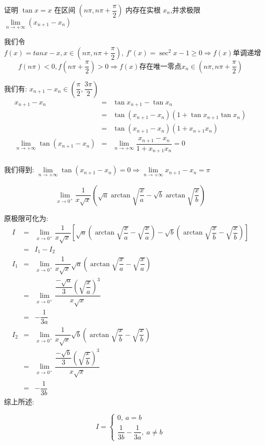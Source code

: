 \begin{example}[][Exam: 32.2.13]
	证明 $\tan x=x$ 在区间 $(n\pi,n\pi+\dfrac{\pi}{2})$ 内存在实根 $x_{n}$,并求极限 $\lim\limits_{n\to +\infty}(x_{n+1}-x_{n})$
\end{example}

\begin{solution}
	
	我们令$f(x)=tan x-x,x\in(n\pi,n\pi+\dfrac{\pi}{2}),\ f'(x)=\sec^{2} x -1\geq 0\Rightarrow f(x)\text{单调递增}$
	$$f(n\pi)<0,f(n\pi+\dfrac{\pi}{2})>0\Rightarrow f(x)\text{存在唯一零点} x_{n}\in (n\pi,n\pi+\dfrac{\pi}{2})$$
	
	我们有: $x_{n+1}-x_{n}\in(\dfrac{\pi}{2},\dfrac{3\pi}{2})$
	\begin{eqnarray*}
		x_{n+1}-x_{n}&=&\tan x_{n+1}-\tan x_{n}\\
		&=&\tan(x_{n+1}-x_{n})(1+\tan x_{n+1}\tan x_{n})\\
		&=&\tan(x_{n+1}-x_{n})(1+x_{n+1}x_{n})\\
		\lim\limits_{n\to +\infty}\tan(x_{n+1}-x_{n})&=&\lim\limits_{n\to +\infty}\dfrac{x_{n+1}-x_{n}}{1+x_{n+1}x_{n}}=0\\
	\end{eqnarray*}
	
	我们得到: $\lim\limits_{n\to +\infty}\tan(x_{n+1}-x_{n})=0\Rightarrow \lim\limits_{n\to +\infty}x_{n+1}-x_{n}=\pi$
\end{solution}

\begin{example}[][Exam: 32.2.14]
	$$\lim\limits_{x\to 0^{+}}\dfrac{1}{x\sqrt{x}}(\sqrt{a}\arctan\sqrt{\dfrac{x}{a}}-\sqrt{b}\arctan\sqrt{\dfrac{x}{b}})$$
\end{example}

\begin{solution}
	
	原极限可化为: 
	\begin{eqnarray*}
		I&=&\lim\limits_{x\to 0^{+}}\dfrac{1}{x\sqrt{x}}[\sqrt{a}(\arctan\sqrt{\dfrac{x}{a}}-\sqrt{\dfrac{x}{a}})-\sqrt{b}(\arctan\sqrt{\dfrac{x}{b}}-\sqrt{\dfrac{x}{b}})]\\
		&=&I_{1}-I_{2}\\
		I_{1}&=&\lim\limits_{x\to 0^{+}}\dfrac{1}{x\sqrt{x}}\sqrt{a}(\arctan\sqrt{\dfrac{x}{a}}-\sqrt{\dfrac{x}{a}})\\
		&=&\lim\limits_{x\to 0^{+}}\dfrac{\dfrac{-\sqrt{a}}{3}(\sqrt{\dfrac{x}{a}})^3}{x\sqrt{x}}\\
		&=&-\dfrac{1}{3a}\\
		I_{2}&=&\lim\limits_{x\to 0^{+}}\dfrac{1}{x\sqrt{x}}\sqrt{b}(\arctan\sqrt{\dfrac{x}{b}}-\sqrt{\dfrac{x}{b}})\\
		&=&\lim\limits_{x\to 0^{+}}\dfrac{\dfrac{-\sqrt{b}}{3}(\sqrt{\dfrac{x}{b}})^3}{x\sqrt{x}}\\
		&=&-\dfrac{1}{3b}
	\end{eqnarray*}
	综上所述: 
	
	$$I=\left\lbrace 
	\begin{array}{l}
		0,\ a=b\\
		\dfrac{1}{3b}-\dfrac{1}{3a},\ a\neq b
	\end{array}
	\right. $$
\end{solution}


